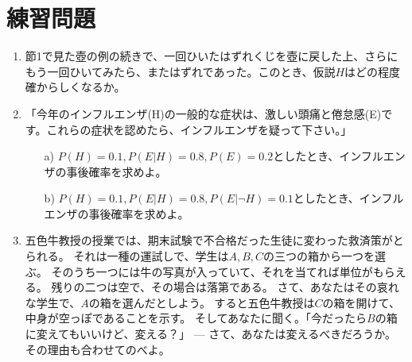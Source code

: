 \documentclass{jsarticle}
\begin{document}



\section*{練習問題}

\begin{enumerate}
 \item 節1で見た壺の例の続きで、一回ひいたはずれくじを壺に戻した上、さらにもう一回ひいてみたら、またはずれであった。このとき、仮説$H$はどの程度確からしくなるか。


 \item 「今年のインフルエンザ(H)の一般的な症状は、激しい頭痛と倦怠感(E)です。これらの症状を認めたら、インフルエンザを疑って下さい。」
\begin{enumerate}
 \item[a) ] $P(H)=0.1, P(E|H)=0.8, P(E)=0.2$としたとき、インフルエンザの事後確率を求めよ。
 \item[b) ] $P(H)=0.1, P(E|H)=0.8, P(E|\neg H)=0.1$としたとき、インフルエンザの事後確率を求めよ。
\end{enumerate}

 \item 五色牛教授の授業では、期末試験で不合格だった生徒に変わった救済策がとられる。
それは一種の運試しで、学生は$A, B, C$の三つの箱から一つを選ぶ。
そのうち一つには牛の写真が入っていて、それを当てれば単位がもらえる。
残りの二つは空で、その場合は落第である。
さて、あなたはその哀れな学生で、$A$の箱を選んだとしよう。
すると五色牛教授は$C$の箱を開けて、中身が空っぽであることを示す。
そしてあなたに聞く。「今だったら$B$の箱に変えてもいいけど、変える？」
--- さて、あなたは変えるべきだろうか。その理由も合わせてのべよ。
\end{enumerate}
\end{document}
